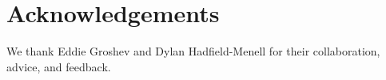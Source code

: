 \section{Acknowledgements}
We thank Eddie Groshev and Dylan Hadfield-Menell for their collaboration, advice, and feedback.
